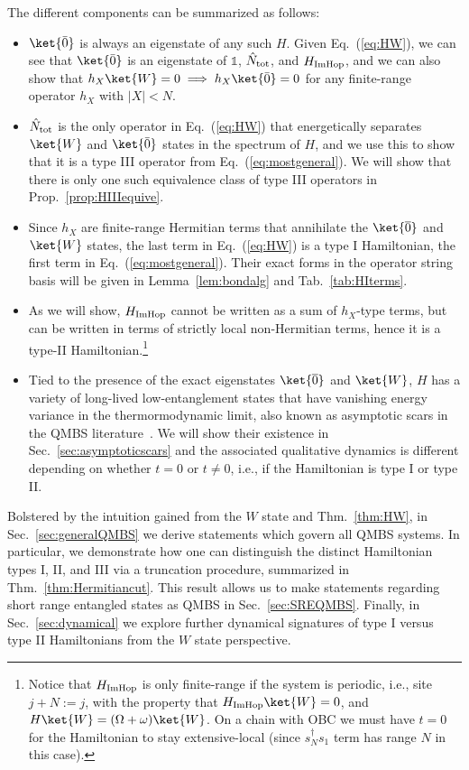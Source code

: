 \documentclass[prx,letterpaper,aps,superscriptaddress,floatfix,twocolumn,nofootinbib]{revtex4-2}
\theoremstyle{definition}
\begin{document}
%
The different components can be summarized as follows:
\begin{itemize}
    \item $\ket{\bar{0}}$ is always an eigenstate of any such $H$.
    Given Eq.~(\ref{eq:HW}), we can see that $\ket{\bar{0}}$ is an eigenstate of $\mathds{1}$, $\hat{N}_{\rm tot}$, and $H_{\rm ImHop}$, and we can also show that $h_X \ket{W} = 0 \implies h_X \ket{\bar{0}} = 0$ for any finite-range operator $h_X$ with $|X| < N$.
    \item $\hat{N}_{\rm tot}$ is the only operator in Eq.~(\ref{eq:HW}) that energetically separates $\ket{W}$ and $\ket{\bar{0}}$ states in the spectrum of $H$, and we use this to show that it is a type III operator from Eq.~(\ref{eq:mostgeneral}).
    We will show that there is only one such equivalence class of type III operators in Prop.~\ref{prop:HIIIequive}.
    \item Since $h_X$ are finite-range Hermitian terms that annihilate the $\ket{\overline{0}}$ and $\ket{W}$ states, the last term in Eq.~(\ref{eq:HW}) is a type I Hamiltonian, the first term in Eq.~(\ref{eq:mostgeneral}).
    Their exact forms in the operator string basis will be given in Lemma~\ref{lem:bondalg} and Tab.~\ref{tab:HIterms}.
    \item As we will show, $H_{\rm ImHop}$  cannot be written as a sum of $h_X$-type terms, but can be written in terms of strictly local non-Hermitian terms, hence it is a type-II Hamiltonian.\footnote{Notice that $H_{\rm ImHop}$ is only finite-range if the system is periodic, i.e., site $j+N := j$, with the property that $H_{\rm ImHop}\ket{W}=0$, and $H\ket{W}=(\Omega + \omega)\ket{W}$. On a chain with OBC we must have $t=0$ for the Hamiltonian to stay extensive-local (since $s_N^\dagger s_1$ term has range $N$ in this case).}
    \item Tied to the presence of the exact eigenstates $\ket{\overline{0}}$ and $\ket{W}$, $H$ has a variety of long-lived low-entanglement states that have vanishing energy variance in the thermormodynamic limit, also known as asymptotic scars in the QMBS literature~\cite{Gotta2023AsymptoticScars, Kunimi2023AsymptoticScarsDMI, ren2024quasi, kunimi2025systematic, Lin_2020slow}.
    We will show their existence in Sec.~\ref{sec:asymptoticscars} and the associated qualitative dynamics is different depending on whether $t = 0$ or $t \neq 0$, i.e., if the Hamiltonian is type I or type II.
\end{itemize}
%
Bolstered by the intuition gained from the $W$ state and Thm.~\ref{thm:HW}, in Sec.~\ref{sec:generalQMBS} we derive statements which govern all QMBS systems.
%
In particular, we demonstrate how one can distinguish the distinct Hamiltonian types I, II, and III via a truncation procedure, summarized in Thm.~\ref{thm:Hermitiancut}.
%
This result allows us to make statements regarding short range entangled states as QMBS in Sec.~\ref{sec:SREQMBS}.
%
Finally, in Sec.~\ref{sec:dynamical} we explore further dynamical signatures of type I versus type II Hamiltonians from the $W$ state perspective.
%
\end{document}
